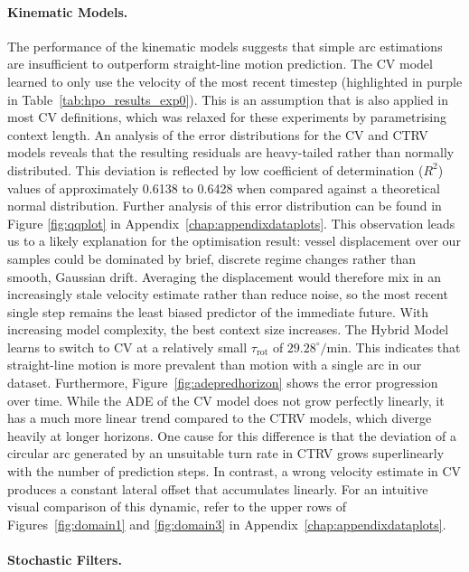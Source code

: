 \paragraph{Kinematic Models.}
The performance of the kinematic models suggests that simple arc estimations are insufficient to outperform straight-line motion prediction. The \ac{CV} model learned to only use the velocity of the most recent timestep (highlighted in purple in Table~\ref{tab:hpo_results_exp0}).
This is an assumption that is also applied in most \ac{CV} definitions, which was relaxed for these experiments by parametrising context length. 
An analysis of the error distributions for the \ac{CV} and \ac{CTRV} models reveals that the resulting residuals are heavy-tailed rather than normally distributed. This deviation is reflected by low coefficient of determination ($R^2$) values of approximately 0.6138 to 0.6428 when compared against a theoretical normal distribution. Further analysis of this error distribution can be found in Figure \ref{fig:qqplot} in Appendix~\ref{chap:appendixdataplots}.
This observation leads us to a likely explanation for the optimisation result: vessel displacement over our samples could be dominated by brief, discrete regime changes rather than smooth, Gaussian drift. Averaging the displacement would therefore mix in an increasingly stale velocity estimate rather than reduce noise, so the most recent single step remains the least biased predictor of the immediate future.
With increasing model complexity, the best context size increases. The Hybrid Model learns to switch to \ac{CV} at a relatively small $\tau_\text{rot}$ of $29.28^\circ/\text{min}$. This indicates that straight-line motion is more prevalent than motion with a single arc in our dataset. 
Furthermore, Figure~\ref{fig:adepredhorizon} shows the error progression over time. While the \ac{ADE} of the \ac{CV} model does not grow perfectly linearly, it has a much more linear trend compared to the \ac{CTRV} models, which diverge heavily at longer horizons.
One cause for this difference is that the deviation of a circular arc generated by an unsuitable turn rate in \ac{CTRV} grows superlinearly with the number of prediction steps. In contrast, a wrong velocity estimate in \ac{CV} produces a constant lateral offset that accumulates linearly.
For an intuitive visual comparison of this dynamic, refer to the upper rows of Figures~\ref{fig:domain1} and \ref{fig:domain3} in Appendix~\ref{chap:appendixdataplots}.

\paragraph{Stochastic Filters.}

